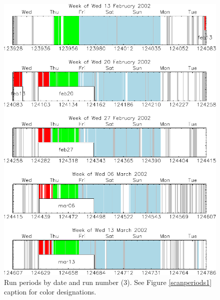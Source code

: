\documentclass[aps,prd,preprint,superscriptaddress,tightenlines,nofootinbib,floatfix]{revtex4}
\begin{document}
\begin{figure}[p]
  \includegraphics[width=0.95\linewidth]{scan_periods3}
  \caption{\label{scanperiods3} Run periods by date and run number
  (3).  See Figure \ref{scanperiods1} caption for color
  designations.}
\end{figure}
\end{document}
